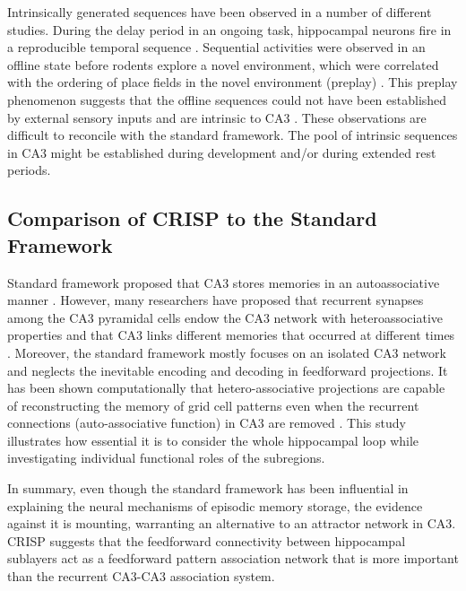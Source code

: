 \documentclass[utf8]{frontiersSCNS} %
\begin{document}
Intrinsically generated sequences have been observed in a number of different studies. During the delay period in an ongoing task, hippocampal neurons fire in a reproducible temporal sequence \citep{pastalkova2008internally, macdonald2011hippocampal}.  Sequential activities were observed in an offline state before rodents explore a novel environment, which were correlated with the ordering of place fields in the novel environment (preplay) \citep{dragoi2011preplay}. This preplay phenomenon suggests that the offline sequences could not have been established by external sensory inputs and are intrinsic to CA3 \citep{azizi2013computational}. These observations are difficult to reconcile with the standard framework. The pool of intrinsic sequences in CA3 might be established during development and/or during extended rest periods.  


\subsection{Comparison of CRISP to the Standard Framework}
Standard framework proposed that CA3 stores memories in an autoassociative manner \citep{marr1991simple, mcnaughton1987hippocampal, treves1992computational}.
%
However, many researchers have proposed that recurrent synapses among the CA3 pyramidal cells endow the CA3 network with heteroassociative properties and that CA3 links different memories that occurred at different times \citep{lisman1999relating,  jensen1996hippocampal, wallenstein1997gabaergic, lew1996sequence}.
%
Moreover, the standard framework mostly focuses on an isolated CA3 network and neglects the inevitable encoding and decoding in feedforward projections. It has been shown computationally that hetero-associative projections are capable of reconstructing the memory of grid cell patterns even when the recurrent connections (auto-associative function) in CA3 are removed \citep{neher2015memory}. This study illustrates how essential it is to consider the whole hippocampal loop while investigating individual functional roles of the subregions. 

In summary, even though the standard framework has been influential in explaining the neural mechanisms of episodic memory storage, the evidence against it is mounting, warranting an alternative to an attractor network in CA3. CRISP suggests that the feedforward connectivity between hippocampal sublayers act as a feedforward pattern association network that is more important than the recurrent CA3-CA3 association system. 
\end{document}
